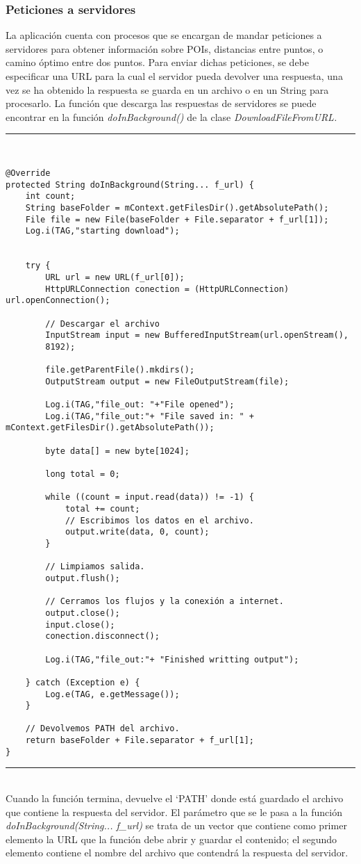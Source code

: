 \subsubsection{Peticiones a servidores}
La aplicación cuenta con procesos que se encargan de mandar peticiones a servidores para obtener información sobre POIs, distancias entre puntos, o camino óptimo entre dos puntos. Para enviar dichas peticiones, se debe especificar una URL para la cual el servidor pueda devolver una respuesta, una vez se ha obtenido la respuesta se guarda en un archivo o en un String para procesarlo. La función que descarga las respuestas de servidores se puede encontrar en la función \textit{doInBackground()} de la clase \textit{DownloadFileFromURL.}\newline
\newpage
\noindent\rule[-1ex]{\textwidth}{1pt}\\
\begin{lstlisting}[caption=Función para enviar peticiones a servidores y guardar respuesta.]
@Override
protected String doInBackground(String... f_url) {
	int count;
	String baseFolder = mContext.getFilesDir().getAbsolutePath();
	File file = new File(baseFolder + File.separator + f_url[1]);
	Log.i(TAG,"starting download");
	
	
	try {
		URL url = new URL(f_url[0]);
		HttpURLConnection conection = (HttpURLConnection) url.openConnection();
		
		// Descargar el archivo
		InputStream input = new BufferedInputStream(url.openStream(),
		8192);
		
		file.getParentFile().mkdirs();
		OutputStream output = new FileOutputStream(file);
		
		Log.i(TAG,"file_out: "+"File opened");
		Log.i(TAG,"file_out:"+ "File saved in: " + mContext.getFilesDir().getAbsolutePath());
		
		byte data[] = new byte[1024];
		
		long total = 0;
		
		while ((count = input.read(data)) != -1) {
			total += count;
			// Escribimos los datos en el archivo.
			output.write(data, 0, count);
		}
		
		// Limpiamos salida.
		output.flush();
		
		// Cerramos los flujos y la conexión a internet.
		output.close();
		input.close();
		conection.disconnect();
		
		Log.i(TAG,"file_out:"+ "Finished writting output");
	
	} catch (Exception e) {
		Log.e(TAG, e.getMessage());
	}
	
	// Devolvemos PATH del archivo.
	return baseFolder + File.separator + f_url[1];
}
\end{lstlisting}
\noindent\rule[-1ex]{\textwidth}{1pt}\\
\newpage
Cuando la función termina, devuelve el \enquote*{PATH} donde está guardado el archivo que contiene la respuesta del servidor. El parámetro que se le pasa a la función \textit{doInBackground(String... f\_url)} se trata de un vector que contiene como primer elemento la URL que la función debe abrir y guardar el contenido; el segundo elemento contiene el nombre del archivo que contendrá la respuesta del servidor.
